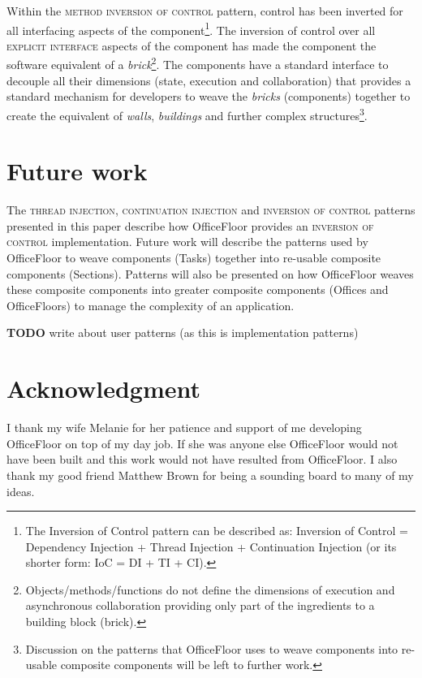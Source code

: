 \documentclass[prodmode]{style/acmlarge}
\begin{document}
Within the \textsc{method inversion of control} pattern, control has been
inverted for all interfacing aspects of the component\footnote{The Inversion of
Control pattern can be described as: Inversion of Control = Dependency Injection
+ Thread Injection + Continuation Injection (or its shorter form: IoC = DI + TI
+ CI).}.  The inversion of control over all \textsc{explicit interface} aspects
of the component has made the component the software equivalent of a
\textit{brick}\footnote{Objects/methods/functions do not define the dimensions
of execution and asynchronous collaboration providing only part of the
ingredients to a building block (brick).}.  The components have a standard
interface to decouple all their dimensions (state, execution and collaboration)
that provides a standard mechanism for developers to weave the \textit{bricks}
(components) together to create the equivalent of \textit{walls},
\textit{buildings} and further complex structures\footnote{Discussion on the
patterns that OfficeFloor \cite{officefloor} uses to weave components into
re-usable composite components will be left to further work.}.



\section{Future work}

The \textsc{thread injection}, \textsc{continuation injection} and
\textsc{inversion of control} patterns presented in this paper describe how
OfficeFloor \cite{officefloor} provides an \textsc{inversion of control}
implementation.  Future work will describe the patterns used by OfficeFloor to
weave components (Tasks) together into re-usable composite components
(Sections).  Patterns will also be presented on how OfficeFloor weaves these
composite components into greater composite components (Offices and
OfficeFloors) to manage the complexity of an application.

\textbf{TODO} write about user patterns (as this is implementation patterns)



\section*{Acknowledgment} 

I thank my wife Melanie for her patience and support
of me developing OfficeFloor on top of my day job.  If she was anyone else
OfficeFloor would not have been built and this work would not have resulted from
OfficeFloor.  I also thank my good friend Matthew Brown for being a sounding
board to many of my ideas.
\end{document}
